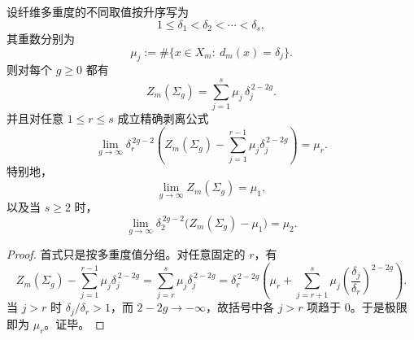 \begin{theorem}[高属极限的底端谱逐层剥离]\label{thm:conclusion-tqft-high-genus-bottom-spectrum-peeling}
设纤维多重度的不同取值按升序写为
\[
1\le \delta_1<\delta_2<\cdots<\delta_s,
\]
其重数分别为
\[
\mu_j:=\#\{x\in X_m:\ d_m(x)=\delta_j\}.
\]
则对每个 \(g\ge 0\) 都有
\[
Z_m(\Sigma_g)=\sum_{j=1}^{s}\mu_j\,\delta_j^{\,2-2g}.
\]
并且对任意 \(1\le r\le s\) 成立精确剥离公式
\[
\lim_{g\to\infty}
\delta_r^{\,2g-2}
\left(
Z_m(\Sigma_g)-\sum_{j=1}^{r-1}\mu_j\delta_j^{\,2-2g}
\right)
=
\mu_r.
\]
特别地，
\[
\lim_{g\to\infty}Z_m(\Sigma_g)=\mu_1,
\]
以及当 \(s\ge 2\) 时，
\[
\lim_{g\to\infty}\delta_2^{\,2g-2}\bigl(Z_m(\Sigma_g)-\mu_1\bigr)=\mu_2.
\]
\end{theorem}
\begin{proof}
首式只是按多重度值分组。对任意固定的 \(r\)，有
\[
Z_m(\Sigma_g)-\sum_{j=1}^{r-1}\mu_j\delta_j^{\,2-2g}
=
\sum_{j=r}^{s}\mu_j\delta_j^{\,2-2g}
=
\delta_r^{\,2-2g}
\left(
\mu_r+\sum_{j=r+1}^{s}\mu_j\left(\frac{\delta_j}{\delta_r}\right)^{2-2g}
\right).
\]
当 \(j>r\) 时 \(\delta_j/\delta_r>1\)，而 \(2-2g\to-\infty\)，故括号中各 \(j>r\) 项趋于 \(0\)。于是极限即为 \(\mu_r\)。证毕。
\end{proof}

